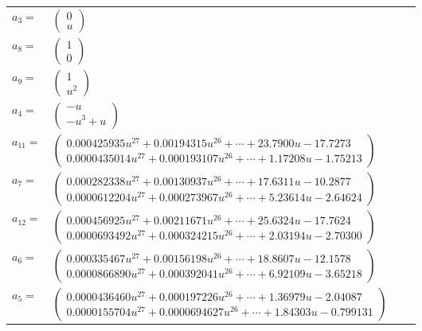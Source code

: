 \documentclass[1p]{elsarticle_modified}
\theoremstyle{definition}
\begin{document}
\begin{tabular}{m{7pt} m{180pt} m{7pt} m{180pt} }
\flushright $a_{3}=$&$\begin{pmatrix}0\\u\end{pmatrix}$ \\
\flushright $a_{8}=$&$\begin{pmatrix}1\\0\end{pmatrix}$ \\
\flushright $a_{9}=$&$\begin{pmatrix}1\\u^2\end{pmatrix}$ \\
\flushright $a_{4}=$&$\begin{pmatrix}- u\\- u^3+u\end{pmatrix}$ \\
\flushright $a_{11}=$&$\begin{pmatrix}0.000425935 u^{27}+0.00194315 u^{26}+\cdots+23.7900 u-17.7273\\0.0000435014 u^{27}+0.000193107 u^{26}+\cdots+1.17208 u-1.75213\end{pmatrix}$ \\
\flushright $a_{7}=$&$\begin{pmatrix}0.000282338 u^{27}+0.00130937 u^{26}+\cdots+17.6311 u-10.2877\\0.0000612204 u^{27}+0.000273967 u^{26}+\cdots+5.23614 u-2.64624\end{pmatrix}$ \\
\flushright $a_{12}=$&$\begin{pmatrix}0.000456925 u^{27}+0.00211671 u^{26}+\cdots+25.6324 u-17.7624\\0.0000693492 u^{27}+0.000324215 u^{26}+\cdots+2.03194 u-2.70300\end{pmatrix}$ \\
\flushright $a_{6}=$&$\begin{pmatrix}0.000335467 u^{27}+0.00156198 u^{26}+\cdots+18.8607 u-12.1578\\0.0000866890 u^{27}+0.000392041 u^{26}+\cdots+6.92109 u-3.65218\end{pmatrix}$ \\
\flushright $a_{5}=$&$\begin{pmatrix}0.0000436460 u^{27}+0.000197226 u^{26}+\cdots+1.36979 u-2.04087\\0.0000155704 u^{27}+0.0000694627 u^{26}+\cdots+1.84303 u-0.799131\end{pmatrix}$ \\

\end{tabular}
\end{document}
